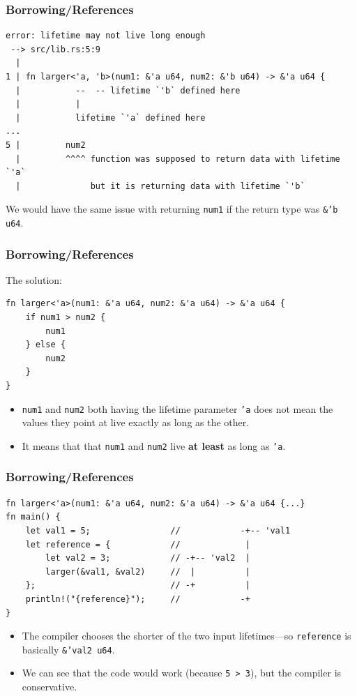 \begin{frame}[fragile]
    \frametitle{Borrowing/References}
    \begin{verbatim}
error: lifetime may not live long enough
 --> src/lib.rs:5:9
  |
1 | fn larger<'a, 'b>(num1: &'a u64, num2: &'b u64) -> &'a u64 {
  |           --  -- lifetime `'b` defined here
  |           |
  |           lifetime `'a` defined here
...
5 |         num2
  |         ^^^^ function was supposed to return data with lifetime `'a`
  |              but it is returning data with lifetime `'b`
    \end{verbatim}
    \pause
    \vfill
    We would have the same issue with returning \texttt{num1} if the return type was  \texttt{\&'b u64}.
\end{frame}

\begin{frame}[fragile]
    \frametitle{Borrowing/References}
    The solution:
    \begin{verbatim}
fn larger<'a>(num1: &'a u64, num2: &'a u64) -> &'a u64 {
    if num1 > num2 {
        num1
    } else {
        num2
    }
}
    \end{verbatim}
    \pause
    \begin{itemize}
        \item \texttt{num1} and \texttt{num2} both having the lifetime parameter \texttt{'a} does not mean the values they point at live exactly as long as the other.
        \pause
        \item It means that that \texttt{num1} and \texttt{num2} live \textbf{at least} as long as \texttt{'a}.
    \end{itemize}
\end{frame}

\begin{frame}[fragile]
    \frametitle{Borrowing/References}
    \begin{verbatim}
fn larger<'a>(num1: &'a u64, num2: &'a u64) -> &'a u64 {...}
fn main() {
    let val1 = 5;                //            -+-- 'val1
    let reference = {            //             |
        let val2 = 3;            // -+-- 'val2  |
        larger(&val1, &val2)     //  |          |
    };                           // -+          |
    println!("{reference}");     //            -+
}
    \end{verbatim}
    \pause
    \begin{itemize}
        \item The compiler chooses the shorter of the two input lifetimes---so \texttt{reference} is basically \texttt{\&'val2 u64}.
        \pause
        \item We can see that the code would work (because \texttt{5 > 3}), but the compiler is conservative.
    \end{itemize}
\end{frame}

